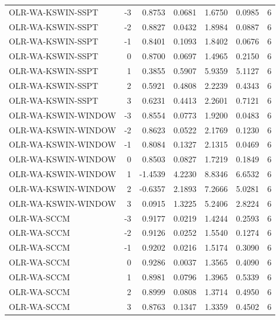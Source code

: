 \begin{tabular}{lrrrrrr}
OLR-WA-KSWIN-SSPT & -3 & 0.8753 & 0.0681 & 1.6750 & 0.0985 & 6 \\
OLR-WA-KSWIN-SSPT & -2 & 0.8827 & 0.0432 & 1.8984 & 0.0887 & 6 \\
OLR-WA-KSWIN-SSPT & -1 & 0.8401 & 0.1093 & 1.8402 & 0.0676 & 6 \\
OLR-WA-KSWIN-SSPT & 0 & 0.8700 & 0.0697 & 1.4965 & 0.2150 & 6 \\
OLR-WA-KSWIN-SSPT & 1 & 0.3855 & 0.5907 & 5.9359 & 5.1127 & 6 \\
OLR-WA-KSWIN-SSPT & 2 & 0.5921 & 0.4808 & 2.2239 & 0.4343 & 6 \\
OLR-WA-KSWIN-SSPT & 3 & 0.6231 & 0.4413 & 2.2601 & 0.7121 & 6 \\
OLR-WA-KSWIN-WINDOW & -3 & 0.8554 & 0.0773 & 1.9200 & 0.0483 & 6 \\
OLR-WA-KSWIN-WINDOW & -2 & 0.8623 & 0.0522 & 2.1769 & 0.1230 & 6 \\
OLR-WA-KSWIN-WINDOW & -1 & 0.8084 & 0.1327 & 2.1315 & 0.0469 & 6 \\
OLR-WA-KSWIN-WINDOW & 0 & 0.8503 & 0.0827 & 1.7219 & 0.1849 & 6 \\
OLR-WA-KSWIN-WINDOW & 1 & -1.4539 & 4.2230 & 8.8346 & 6.6532 & 6 \\
OLR-WA-KSWIN-WINDOW & 2 & -0.6357 & 2.1893 & 7.2666 & 5.0281 & 6 \\
OLR-WA-KSWIN-WINDOW & 3 & 0.0915 & 1.3225 & 5.2406 & 2.8224 & 6 \\
OLR-WA-SCCM & -3 & 0.9177 & 0.0219 & 1.4244 & 0.2593 & 6 \\
OLR-WA-SCCM & -2 & 0.9126 & 0.0252 & 1.5540 & 0.1274 & 6 \\
OLR-WA-SCCM & -1 & 0.9202 & 0.0216 & 1.5174 & 0.3090 & 6 \\
OLR-WA-SCCM & 0 & 0.9286 & 0.0037 & 1.3565 & 0.4090 & 6 \\
OLR-WA-SCCM & 1 & 0.8981 & 0.0796 & 1.3965 & 0.5339 & 6 \\
OLR-WA-SCCM & 2 & 0.8999 & 0.0808 & 1.3714 & 0.4950 & 6 \\
OLR-WA-SCCM & 3 & 0.8763 & 0.1347 & 1.3359 & 0.4502 & 6 \\
\bottomrule
\end{tabular}
